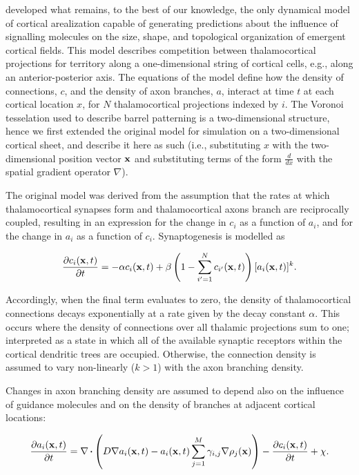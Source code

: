 \documentclass[9pt,twocolumn,twoside,lineno]{pnas-new}
\begin{document}
\cite{karbowski_model_2004} developed what remains, to the best of our knowledge, the
only dynamical model of cortical arealization capable of generating
predictions about the influence of signalling molecules on the size, shape,
and topological organization of emergent cortical fields. This model describes
competition between thalamocortical projections for territory along a
one-dimensional string of cortical cells, e.g., along an anterior-posterior
axis. The equations of the model define how the density of connections, $c$,
and the density of axon branches, $a$, interact at time $t$ at each cortical
location $x$, for $N$ thalamocortical projections indexed by $i$. The Voronoi
tesselation used to describe barrel patterning is a two-dimensional structure,
hence we first extended the original model for simulation on a two-dimensional
cortical sheet, and describe it here as such (i.e., substituting $x$ with the
two-dimensional position vector $\mathbf{x}$ and substituting terms of the form
$\frac{d}{dx}$ with the spatial gradient operator $\nabla$).

The original model was derived from the assumption that the rates at which
thalamocortical synapses form and thalamocortical axons branch are
reciprocally coupled, resulting in an expression for the change in $c_i$ as a
function of $a_i$, and for the change in $a_i$ as a function of
$c_i$. Synaptogenesis is modelled as

\begin{equation} \label{eq:dc}
\frac{\partial c_i(\mathbf{x},t)}{\partial t} =-\alpha c_i(\mathbf{x},t) +\beta  \left(1 - \sum_{i'=1}^{N} c_{i'}(\mathbf{x}, t)\right)[a_i(\mathbf{x},t)]^k.
\end{equation}

Accordingly, when the final term evaluates to zero, the density of
thalamocortical connections decays exponentially at a rate given by the decay
constant $\alpha$. This occurs where the density of connections over all
thalamic projections sum to one; interpreted as a state in which all of the
available synaptic receptors within the cortical dendritic trees are
occupied. Otherwise, the connection density is assumed to vary non-linearly
($k>1$) with the axon branching density.

Changes in axon branching density are assumed to depend also on the
influence of guidance molecules and on the density of branches at
adjacent cortical locations:

%
\begin{equation} \label{eq:da}
\frac{\partial a_i(\mb{x},t)}{\partial t} = \nabla\vcdot\left(D \nabla a_i(\mb{x},t)-a_i(\mb{x},t)\sum_{j=1}^{M} \gamma_{i,j}\nabla \rho_j(\mb{x})\right) - \frac{\partial c_i(\mb{x},t)}{\partial t} + \chi.
\end{equation}
\end{document}
